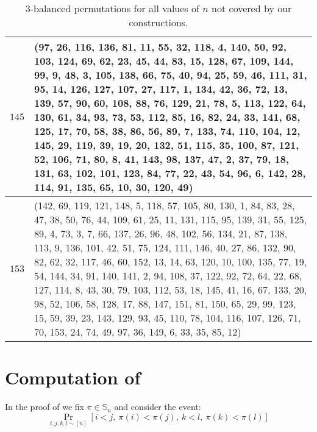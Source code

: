 \documentclass{article}
\newcommand{\Sn}{\mathbb{S}_n}
\theoremstyle{remark}
\theoremstyle{plain}
\begin{document}
\begin{appendices}
\begin{table}[H]
\begin{tabular}{ ||c p{14.3cm}|| }
    \hline

    $145$ & (97, 26, 116, 136, 81, 11, 55, 32, 118, 4, 140, 50, 92, 103, 124, 69, 62, 23, 45, 44, 83, 15, 128, 67, 109, 144, 99, 9, 48, 3, 105, 138, 66, 75, 40, 94, 25, 59, 46, 111, 31, 95, 14, 126, 127, 107, 27, 117, 1, 134, 42, 36, 72, 13, 139, 57, 90, 60, 108, 88, 76, 129, 21, 78, 5, 113, 122, 64, 130, 61, 34, 93, 73, 53, 112, 85, 16, 82, 24, 33, 141, 68, 125, 17, 70, 58, 38, 86, 56, 89, 7, 133, 74, 110, 104, 12, 145, 29, 119, 39, 19, 20, 132, 51, 115, 35, 100, 87, 121, 52, 106, 71, 80, 8, 41, 143, 98, 137, 47, 2, 37, 79, 18, 131, 63, 102, 101, 123, 84, 77, 22, 43, 54, 96, 6, 142, 28, 114, 91, 135, 65, 10, 30, 120, 49) \\
    
    \hline

    $153$ & (142, 69, 119, 121, 148, 5, 118, 57, 105, 80, 130, 1, 84, 83, 28, 47, 38, 50, 76, 44, 109, 61, 25, 11, 131, 115, 95, 139, 31, 55, 125, 89, 4, 73, 3, 7, 66, 137, 26, 96, 48, 102, 56, 134, 21, 87, 138, 113, 9, 136, 101, 42, 51, 75, 124, 111, 146, 40, 27, 86, 132, 90, 82, 62, 32, 117, 46, 60, 152, 13, 14, 63, 120, 10, 100, 135, 77, 19, 54, 144, 34, 91, 140, 141, 2, 94, 108, 37, 122, 92, 72, 64, 22, 68, 127, 114, 8, 43, 30, 79, 103, 112, 53, 18, 145, 41, 16, 67, 133, 20, 98, 52, 106, 58, 128, 17, 88, 147, 151, 81, 150, 65, 29, 99, 123, 15, 59, 39, 23, 143, 129, 93, 45, 110, 78, 104, 116, 107, 126, 71, 70, 153, 24, 74, 49, 97, 36, 149, 6, 33, 35, 85, 12) \\
    
    \hline
    
    \end{tabular}
    
    \caption{$3$-balanced permutations for all values of $n$ not covered by our constructions.}
    \label{table:other_3bal}
\end{table}
 \section{Computation of \texorpdfstring{}{Lemma 4.2}}
\label{appendix:relation_2_3_4_full_details}
In the proof of  we fix $\pi \in \Sn$ and consider the event:
\[
    \Pr_{i,j,k,l \sim [n]} \left[ i < j,\ \pi(i) < \pi(j),\ k < l,\ \pi(k) < \pi(l) \right]
\]


\end{appendices}
\end{document}
